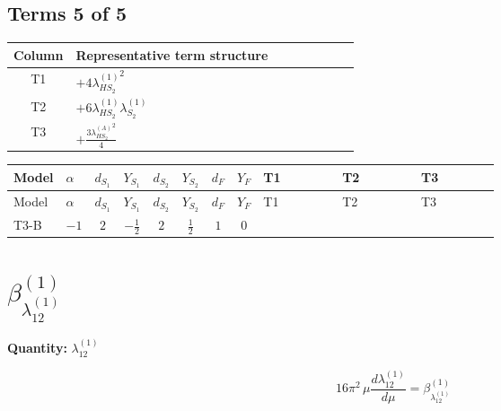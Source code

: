 \documentclass[8pt]{article}
\begin{document}
\begin{landscape}
\subsection*{Terms 5 of 5}
\begin{center}
\begin{tabular}{@{}c >{\raggedright\arraybackslash}p{0.82\linewidth}@{}}
\toprule
Column & Representative term structure \\
\midrule
T1 & \(\displaystyle +4 {\lambda_{HS_2}^{(1)}}^2\) \\
\midrule
T2 & \(\displaystyle +6 {\lambda_{HS_2}^{(1)}} {\lambda_{S_2}^{(1)}}\) \\
\midrule
T3 & \(\displaystyle +\frac{3 {\lambda_{HS_2}^{(A)}}^2}{4}\) \\
\midrule
\bottomrule
\end{tabular}
\end{center}
\smallskip
\tiny
\begin{longtable}{@{}llcccccc >{\raggedright\arraybackslash}p{0.21\linewidth} >{\raggedright\arraybackslash}p{0.21\linewidth} >{\raggedright\arraybackslash}p{0.21\linewidth}@{}}
\toprule
Model & $\alpha$ & $d_{S_1}$ & $Y_{S_1}$ & $d_{S_2}$ & $Y_{S_2}$ & $d_F$ & $Y_F$ & T1 & T2 & T3 \\
\midrule
\endfirsthead
\toprule
Model & $\alpha$ & $d_{S_1}$ & $Y_{S_1}$ & $d_{S_2}$ & $Y_{S_2}$ & $d_F$ & $Y_F$ & T1 & T2 & T3 \\
\midrule
\endhead
T3-B & $-1$ & $2$ & $-\frac{1}{2}$ & $2$ & $\frac{1}{2}$ & $1$ & $0$ & \scriptsize\adjustbox{max width=\linewidth}{$\begin{gathered} +4 {\lambda_{HS_2}^{(1)}}^2\end{gathered}$} & \scriptsize\adjustbox{max width=\linewidth}{$\begin{gathered} +6 {\lambda_{HS_2}^{(1)}} {\lambda_{S_2}^{(1)}}\end{gathered}$} & \scriptsize\adjustbox{max width=\linewidth}{$\begin{gathered} +\frac{3 {\lambda_{HS_2}^{(A)}}^2}{4}\end{gathered}$} \\
\midrule
\bottomrule
\end{longtable}
\clearpage
\section*{$\beta_{\lambda_{12}^{(1)}}^{(1)}$}
\noindent\textbf{Quantity: }$\lambda_{12}^{(1)}$\par\smallskip
\[16\pi^2\,\mu\frac{d \lambda_{12}^{(1)}}{d\mu}=\beta_{\lambda_{12}^{(1)}}^{(1)}\]

\end{landscape}
\end{document}
